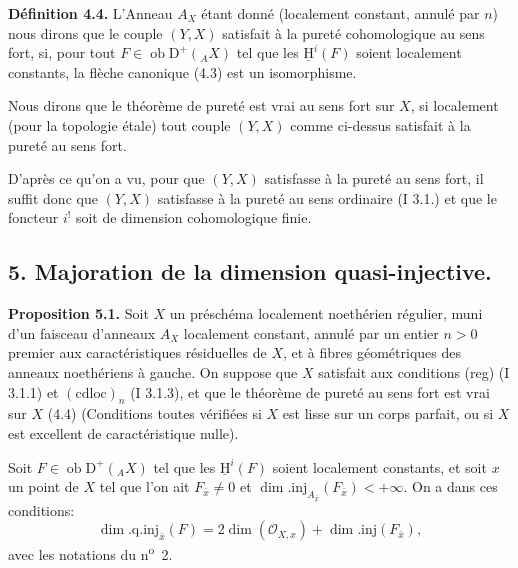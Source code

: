 \documentclass[11pt]{article}
\providecommand{\uH}{\underline{\mathrm H}}
\newcommand{\D}{\mathrm{D}}
\newcommand{\ob}{\operatorname{ob}}
\providecommand{\ob}{\operatorname{ob}}
\begin{document}
\textbf{Définition 4.4.} L'Anneau $A_X$ étant donné (localement constant, annulé par $n$) nous dirons que le couple $(Y,X)$ satisfait à la pureté cohomologique au sens fort, si, pour tout $F\in\ob\D^+({}_A X)$ tel que les $\uH^i(F)$ soient localement constants, la flèche canonique (4.3) est un isomorphisme.

Nous dirons que le théorème de pureté est vrai au sens fort sur $X$, si localement (pour la topologie étale) tout couple $(Y,X)$ comme ci-dessus satisfait à la pureté au sens fort.

D'après ce qu'on a vu, pour que $(Y,X)$ satisfasse à la pureté au sens fort, il suffit donc que $(Y,X)$ satisfasse à la pureté au sens ordinaire (I 3.1.) et que le foncteur $i^!$ soit de dimension cohomologique finie.

\subsection*{5. Majoration de la dimension quasi-injective.}

\textbf{Proposition 5.1.} Soit $X$ un préschéma localement noethérien régulier, muni d'un faisceau d'anneaux $A_X$ localement constant, annulé par un entier $n>0$ premier aux caractéristiques résiduelles de $X$, et à fibres géométriques des anneaux noethériens à gauche. On suppose que $X$ satisfait aux conditions (reg) (I 3.1.1) et $(\mathrm{cdloc})_n$ (I 3.1.3), et que le théorème de pureté au sens fort est vrai sur $X$ (4.4) (Conditions toutes vérifiées si $X$ est lisse sur un corps parfait, ou si $X$ est excellent de caractéristique nulle).

Soit $F\in\ob\D^+({}_A X)$ tel que les $\uH^i(F)$ soient localement constants, et soit $x$ un point de $X$ tel que l'on ait $F_{\bar{x}}\neq0$ et $\dim.\mathrm{inj}_{A_{\bar{x}}}(F_{\bar{x}})<+\infty$. On a dans ces conditions:
\[
        \dim.\mathrm{q.inj}_{\bar{x}}(F)=2\dim(\mathcal{O}_{X,x})+\dim.\mathrm{inj}(F_{\bar{x}}),
\]
avec les notations du n\textsuperscript{o}~2.
\end{document}
